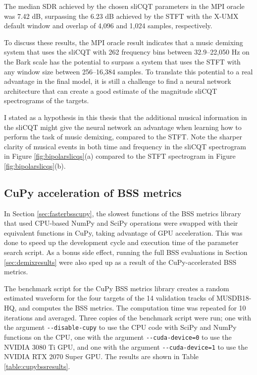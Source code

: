 \documentclass[report.tex]{subfiles}
\begin{document}
The median SDR achieved by the chosen sliCQT parameters in the MPI oracle was 7.42 dB, surpassing the 6.23 dB achieved by the STFT with the X-UMX default window and overlap of 4,096 and 1,024 samples, respectively.

To discuss these results, the MPI oracle result indicates that a music demixing system that uses the sliCQT with 262 frequency bins between 32.9--22,050 Hz on the Bark scale has the potential to surpass a system that uses the STFT with any window size between 256--16,384 samples. To translate this potential to a real advantage in the final model, it is still a challenge to find a neural network architecture that can create a good estimate of the magnitude sliCQT spectrograms of the targets.

I stated as a hypothesis in this thesis that the additional musical information in the sliCQT might give the neural network an advantage when learning how to perform the task of music demixing, compared to the STFT. Note the sharper clarity of musical events in both time and frequency in the sliCQT spectrogram in Figure \ref{fig:bipolarslicqs}(a) compared to the STFT spectrogram in Figure \ref{fig:bipolarslicqs}(b).

\subsection{CuPy acceleration of BSS metrics}
\label{sec:cupyportbss}

In Section \ref{sec:fasterbsscupy}, the slowest functions of the BSS metrics library that used CPU-based NumPy and SciPy operations were swapped with their equivalent functions in CuPy, taking advantage of GPU acceleration. This was done to speed up the development cycle and execution time of the parameter search script. As a bonus side effect, running the full BSS evaluations in Section \ref{sec:demixresults} were also sped up as a result of the CuPy-accelerated BSS metrics.

The benchmark script for the CuPy BSS metrics library creates a random estimated waveform for the four targets of the 14 validation tracks of MUSDB18-HQ, and computes the BSS metrics. The computation time was repeated for 10 iterations and averaged. Three copies of the benchmark script were run; one with the argument \Verb#--disable-cupy# to use the CPU code with SciPy and NumPy functions on the CPU, one with the argument \Verb#--cuda-device=0# to use the NVIDIA 3080 Ti GPU, and one with the argument \Verb#--cuda-device=1# to use the NVIDIA RTX 2070 Super GPU. The results are shown in Table \ref{table:cupybssresults}.
\end{document}
